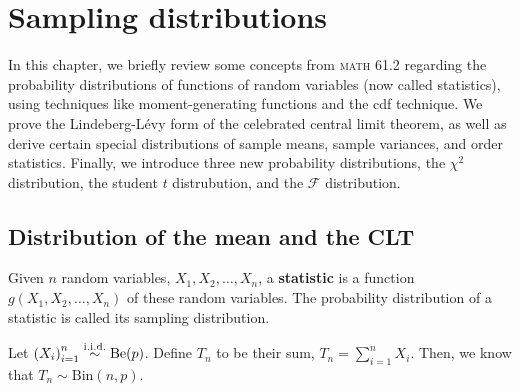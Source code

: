 \chapter{Sampling distributions}
In this chapter, we briefly review some concepts from \textsc{math} 61.2 regarding the probability distributions of functions of random variables (now called statistics), using techniques like moment-generating functions and the cdf technique. 
We prove the Lindeberg-L\'evy form of the celebrated central limit theorem, as well as derive certain special distributions of sample means, sample variances, and order statistics. 
Finally, we introduce three new probability distributions, the \(\chi^2\) distribution, the student \(t\) distrubution, and the \(\mathscr{F}\) distribution. 
\section{Distribution of the mean and the CLT}
Given \(n\) random variables, \(X_1,X_2,\ldots, X_n\), a \textbf{statistic} is a function \(g(X_1, X_2,\ldots, X_n)\) of these random variables. 
The probability distribution of a statistic is called its sampling distribution. 
\begin{example}
    Let \({(X_i)}_{i=1}^n\stackrel{\mathrm{i.i.d.}}{\sim} \mathrm{Be}(p)\). 
    Define \(T_n\) to be their sum, \(T_n = \sum_{i=1}^n X_i\). 
    Then, we know that \(T_n \sim \mathrm{Bin}(n,p)\). 
\end{example}
